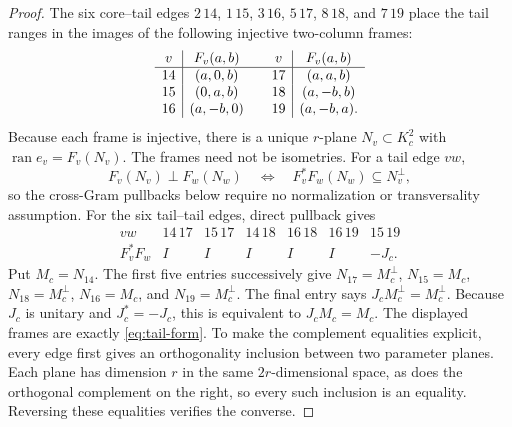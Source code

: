 \documentclass[11pt]{article}
\newcommand{\ran}{\operatorname{ran}}
\begin{document}
\begin{proof}
The six core--tail edges $2\,14$, $1\,15$, $3\,16$, $5\,17$, $8\,18$, and
$7\,19$ place the tail ranges in the images of the following injective
two-column frames:
\[
\begin{array}{c|c@{\qquad}c|c}
v&F_v(a,b)&v&F_v(a,b)\\ \hline
14&(a,0,b)&17&(a,a,b)\\
15&(0,a,b)&18&(a,-b,b)\\
16&(a,-b,0)&19&(a,-b,a).
\end{array}
\]
Because each frame is injective, there is a unique $r$-plane
$N_v\subset K_c^2$ with $\ran e_v=F_v(N_v)$.  The frames need not be
isometries.  For a tail edge $vw$,
\[
 F_v(N_v)\perp F_w(N_w)
 \quad\Longleftrightarrow\quad
 F_v^*F_w(N_w)\subseteq N_v^\perp,
\]
so the cross-Gram pullbacks below require no normalization or transversality
assumption.
For the six tail--tail edges, direct pullback gives
\[
\begin{array}{c|cccccc}
vw&14\,17&15\,17&14\,18&16\,18&16\,19&15\,19\\ \hline
F_v^*F_w&I&I&I&I&I&-J_c.
\end{array}
\]
Put $M_c=N_{14}$.  The first five entries successively give
$N_{17}=M_c^\perp$, $N_{15}=M_c$, $N_{18}=M_c^\perp$,
$N_{16}=M_c$, and $N_{19}=M_c^\perp$.  The final entry says
$J_cM_c^\perp=M_c^\perp$.  Because $J_c$ is unitary and $J_c^*=-J_c$,
this is equivalent to $J_cM_c=M_c$.  The displayed frames are exactly
\eqref{eq:tail-form}.  To make the complement equalities explicit, every
edge first gives an orthogonality inclusion between two parameter planes.
Each plane has dimension $r$ in the same $2r$-dimensional space, as does the
orthogonal complement on the right, so every such inclusion is an equality.
Reversing these equalities verifies the converse.
\end{proof}
\end{document}
